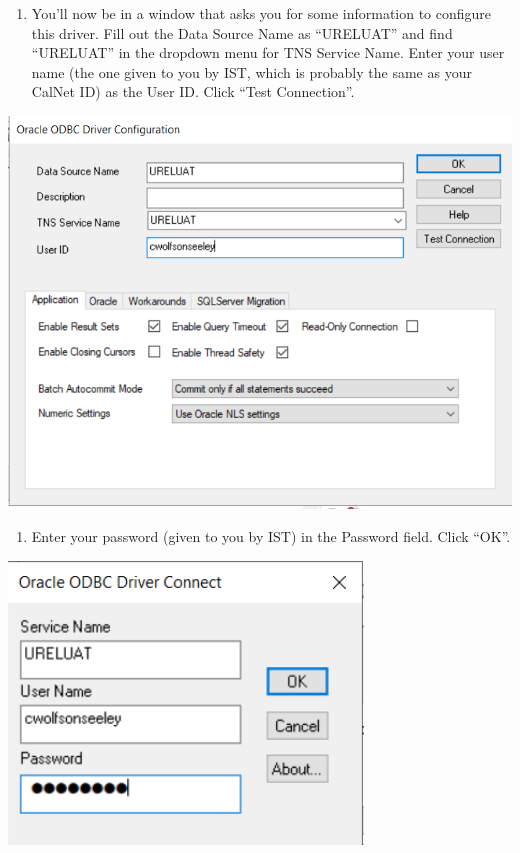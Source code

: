 \documentclass[]{book}
\providecommand{\tightlist}{%
  \setlength{\itemsep}{0pt}\setlength{\parskip}{0pt}}
\begin{document}
\begin{enumerate}
\def\labelenumi{\arabic{enumi})}
\setcounter{enumi}{3}
\tightlist
\item
  You'll now be in a window that asks you for some information to configure this driver. Fill out the Data Source Name as ``URELUAT'' and find ``URELUAT'' in the dropdown menu for TNS Service Name. Enter your user name (the one given to you by IST, which is probably the same as your CalNet ID) as the User ID. Click ``Test Connection''.
\end{enumerate}

\includegraphics[width=7.82in]{images/configuration}

\begin{enumerate}
\def\labelenumi{\arabic{enumi})}
\setcounter{enumi}{4}
\tightlist
\item
  Enter your password (given to you by IST) in the Password field. Click ``OK''.
\end{enumerate}

\includegraphics[width=3.71in]{images/test}
\end{document}
